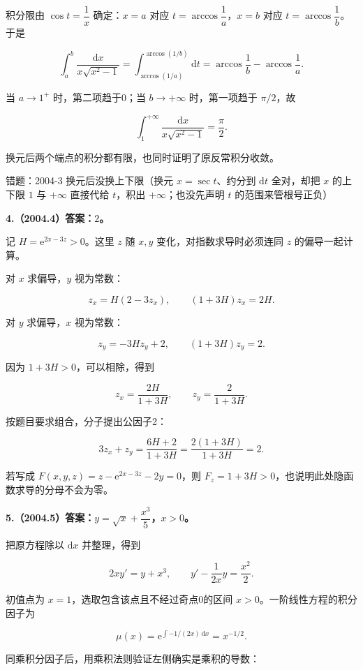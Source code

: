 \documentclass[UTF8,11pt,fontset=windows]{ctexart}
\begin{document}
积分限由 $\cos t=\dfrac1x$ 确定：$x=a$ 对应 $t=\arccos\dfrac1a$，$x=b$ 对应 $t=\arccos\dfrac1b$。于是

$$
\int_a^b\frac{\mathrm dx}{x\sqrt{x^2-1}}
=\int_{\arccos(1/a)}^{\arccos(1/b)}\mathrm dt
=\arccos\frac1b-\arccos\frac1a.
$$

当 $a\to1^+$ 时，第二项趋于0；当 $b\to+\infty$ 时，第一项趋于 $\pi/2$，故

$$
\boxed{\int_1^{+\infty}\frac{\mathrm dx}{x\sqrt{x^2-1}}=\frac\pi2.}
$$

换元后两个端点的积分都有限，也同时证明了原反常积分收敛。

\begingroup\color{gray}错题：2004-3 换元后没换上下限（换元 $x=\sec t$、约分到 $\mathrm dt$ 全对，却把 $x$ 的上下限 $1$ 与 $+\infty$ 直接代给 $t$，积出 $+\infty$；也没先声明 $t$ 的范围来管根号正负）\par\endgroup

\clearpage

\textbf{4.（2004.4）答案：$2$。}

记 $H=\mathrm e^{2x-3z}>0$。这里 $z$ 随 $x,y$ 变化，对指数求导时必须连同 $z$ 的偏导一起计算。

对 $x$ 求偏导，$y$ 视为常数：

$$
z_x=H(2-3z_x),
\qquad (1+3H)z_x=2H.
$$

对 $y$ 求偏导，$x$ 视为常数：

$$
z_y=-3Hz_y+2,
\qquad (1+3H)z_y=2.
$$

因为 $1+3H>0$，可以相除，得到

$$
z_x=\frac{2H}{1+3H},\qquad z_y=\frac2{1+3H}.
$$

按题目要求组合，分子提出公因子2：

$$
\boxed{3z_x+z_y=\frac{6H+2}{1+3H}
=\frac{2(1+3H)}{1+3H}=2.}
$$

若写成 $F(x,y,z)=z-\mathrm e^{2x-3z}-2y=0$，则 $F_z=1+3H>0$，也说明此处隐函数求导的分母不会为零。

\clearpage

\textbf{5.（2004.5）答案：$y=\sqrt x+\dfrac{x^3}{5}$，$x>0$。}

把原方程除以 $\mathrm dx$ 并整理，得到

$$
2xy'=y+x^3,
\qquad y'-\frac{1}{2x}y=\frac{x^2}{2}.
$$

初值点为 $x=1$，选取包含该点且不经过奇点0的区间 $x>0$。一阶线性方程的积分因子为

$$
\mu(x)=\mathrm e^{\int-1/(2x)\,\mathrm dx}=x^{-1/2}.
$$

同乘积分因子后，用乘积法则验证左侧确实是乘积的导数：
\end{document}
